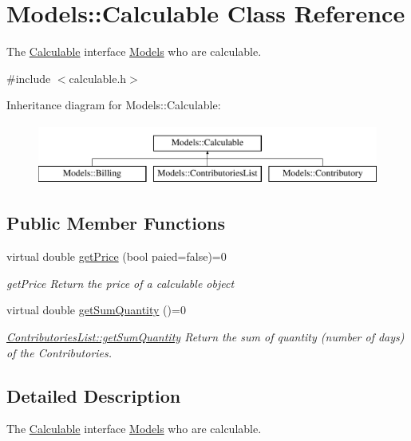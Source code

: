 \hypertarget{classModels_1_1Calculable}{}\section{Models\+:\+:Calculable Class Reference}
\label{classModels_1_1Calculable}


The \hyperlink{classModels_1_1Calculable}{Calculable} interface \hyperlink{namespaceModels}{Models} who are calculable.  




{\ttfamily \#include $<$calculable.\+h$>$}

Inheritance diagram for Models\+:\+:Calculable\+:\begin{figure}[H]
\begin{center}
\leavevmode
\includegraphics[height=2.000000cm]{dc/d99/classModels_1_1Calculable}
\end{center}
\end{figure}
\subsection*{Public Member Functions}
\begin{DoxyCompactItemize}
\item 
virtual double \hyperlink{classModels_1_1Calculable_a5267ee09fc9284063a9fc874b4cc68dc}{get\+Price} (bool paied=false)=0
\begin{DoxyCompactList}\small\item\em get\+Price Return the price of a calculable object \end{DoxyCompactList}\item 
virtual double \hyperlink{classModels_1_1Calculable_a4f9d590b39bd1f0d9e026ac86f1fada1}{get\+Sum\+Quantity} ()=0
\begin{DoxyCompactList}\small\item\em \hyperlink{classModels_1_1ContributoriesList_af9b3b1b703cebeef552d058999ffcc4c}{Contributories\+List\+::get\+Sum\+Quantity} Return the sum of quantity (number of days) of the Contributories. \end{DoxyCompactList}\end{DoxyCompactItemize}


\subsection{Detailed Description}
The \hyperlink{classModels_1_1Calculable}{Calculable} interface \hyperlink{namespaceModels}{Models} who are calculable. 

